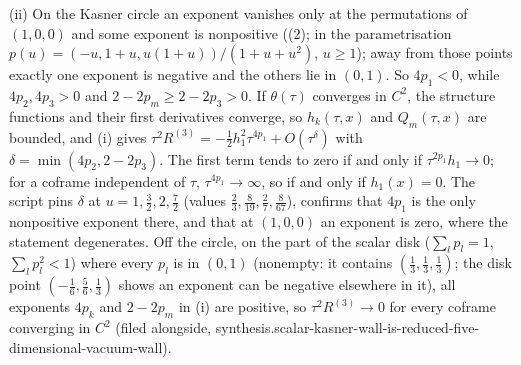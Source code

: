 (ii) On the Kasner circle an exponent vanishes only at the permutations of $(1, 0, 0)$ and some exponent is nonpositive ((2); in the parametrisation $p(u) = (-u, 1 + u, u(1 + u))/(1 + u + u^{2})$, $u \geq 1$); away from those points exactly one exponent is negative and the others lie in $(0, 1)$. So $4p_{1} < 0$, while $4p_{2}, 4p_{3} > 0$ and $2 - 2p_{m} \geq 2 - 2p_{3} > 0$. If $\theta(\tau)$ converges in $C^{2}$, the structure functions and their first derivatives converge, so $h_{k}(\tau, x)$ and $Q_{m}(\tau, x)$ are bounded, and (i) gives $\tau^{2}R^{(3)} = -\tfrac12 h_{1}^{2}\tau^{4p_{1}} + O(\tau^{\delta})$ with $\delta = \min(4p_{2}, 2 - 2p_{3})$. The first term tends to zero if and only if $\tau^{2p_{1}}h_{1} \to 0$; for a coframe independent of $\tau$, $\tau^{4p_{1}} \to \infty$, so if and only if $h_{1}(x) = 0$. The script pins $\delta$ at $u = 1, \tfrac32, 2, \tfrac72$ (values $\tfrac23, \tfrac8{19}, \tfrac27, \tfrac8{67}$), confirms that $4p_{1}$ is the only nonpositive exponent there, and that at $(1, 0, 0)$ an exponent is zero, where the statement degenerates. Off the circle, on the part of the scalar disk ($\sum_{l}p_{l} = 1$, $\sum_{l}p_{l}^{2} < 1$) where every $p_{l}$ is in $(0, 1)$ (nonempty: it contains $(\tfrac13, \tfrac13, \tfrac13)$; the disk point $(-\tfrac16, \tfrac56, \tfrac13)$ shows an exponent can be negative elsewhere in it), all exponents $4p_{k}$ and $2 - 2p_{m}$ in (i) are positive, so $\tau^{2}R^{(3)} \to 0$ for every coframe converging in $C^{2}$ (filed alongside, synthesis.scalar-kasner-wall-is-reduced-five-dimensional-vacuum-wall).

